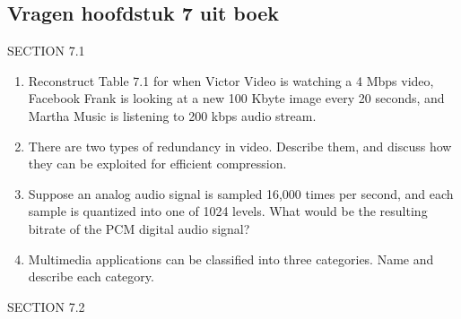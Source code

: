 
\newpage

\subsection{Vragen hoofdstuk 7 uit boek}

\noindent SECTION 7.1

\begin{enumerate}

\item Reconstruct Table 7.1 for when Victor Video is watching a 4 Mbps video, Facebook Frank is looking at a new 100 Kbyte image every 20 seconds, and Martha Music is listening to 200 kbps audio stream.


\item There are two types of redundancy in video. Describe them, and discuss how they can be exploited for efficient compression.


\item Suppose an analog audio signal is sampled 16,000 times per second, and each sample is quantized into one of 1024 levels. What would be the resulting bitrate of the PCM digital audio signal?



\item Multimedia applications can be classified into three categories. Name and
describe each category.


\end{enumerate}

\noindent SECTION 7.2

